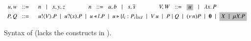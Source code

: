 	\begin{figure}[t]
	\[ 
		\begin{array}{rl}
			u,w  \bnfis& n \bnfbar x,y,z
			\qquad \qquad
			n \bnfis a,b \bnfbar s, \dual{s} 
			\qquad \qquad
			V,W \bnfis \nonhosyntax{u} \bnfbar \abs{x}{P}
			\\[1mm]

			P,Q
			 \bnfis &
			\bout{u}{V}{P}  \sbnfbar  \binp{u}{x}{P} \sbnfbar
			\bsel{u}{l} P \sbnfbar \bbra{u}{l_i:P_i}_{i \in I} \sbnfbar \appl{V}{u}\sbnfbar P\Par Q \sbnfbar \news{n} P 
			\sbnfbar \inact \sbnfbar \nonhosyntax{\rvar{X} \sbnfbar \recp{X}{P}}
		\end{array}
	\]
	\caption{Syntax of \HOp (\HO lacks the constructs in ).}
	\label{fig:syntax}
\end{figure}

